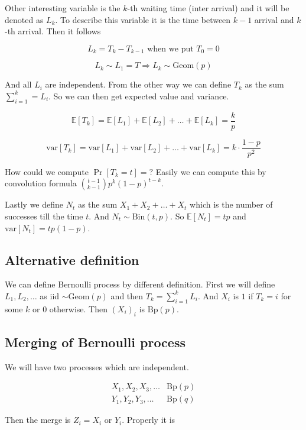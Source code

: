 Other interesting variable is the $k$-th waiting time (inter arrival) and it will be denoted as $L_{k}$. To describe this variable it is the time between $k-1$ arrival and $k$-th arrival. Then it follows

$$
L_{k} = T_{k} - T_{k-1} \text{ when we put } T_{0} = 0
$$

$$
L_{k} \sim L_{1} = T \Rightarrow L_{k} \sim \text{Geom}(p)
$$

And all $L_{i}$ are independent. From the other way we can define $T_{k}$ as the sum $\sum_{i=1}^{k} = L_{i}$. So we can then get expected value and variance.

$$
\mathbb{E}[T_{k}] = \mathbb{E}[L_{1}] + \mathbb{E}[L_{2}] + \dots + \mathbb{E}[L_{k}] = \frac{k}{p}
$$

$$
\text{var}[T_{k}] = \text{var}[L_{1}] + \text{var}[L_{2}] + \dots + \text{var}[L_{k}] = k \cdot \frac{1-p}{p^{2}}
$$

How could we compute $\Pr[T_{k} = t] = ?$ Easily we can compute this by convolution formula $\binom{t-1}{k-1} p^{k}(1-p)^{t-k}$.

Lastly we define $N_{t}$ as the sum $X_{1} + X_{2} + \dots + X_{t}$ which is the number of successes till the time $t$. And $N_{t} \sim \text{Bin}(t,p)$. So $\mathbb{E}[N_{t}] = tp$ and $\text{var}[N_{t}] = tp(1-p)$.

\subsection{Alternative definition}

We can define Bernoulli process by different definition. First we will define $L_{1}, L_{2}, \dots$ as iid $\sim \text{Geom}(p)$ and then $T_{k} = \sum_{i=1}^{k} L_{i}$. And $X_{i}$ is $1$ if $T_{k} = i$ for some $k$ or $0$ otherwise. Then $(X_{i})_{i}$ is $\text{Bp}(p)$.

\subsection{Merging of Bernoulli process}

We will have two processes which are independent.

$$
\begin{array}{rl}
X_{1}, X_{2}, X_{3}, \dots & \text{Bp}(p) \\
Y_{1}, Y_{2}, Y_{3}, \dots & \text{Bp}(q)
\end{array}
$$

Then the merge is $Z_{i} = X_{i} \text{ or } Y_{i}$. Properly it is

